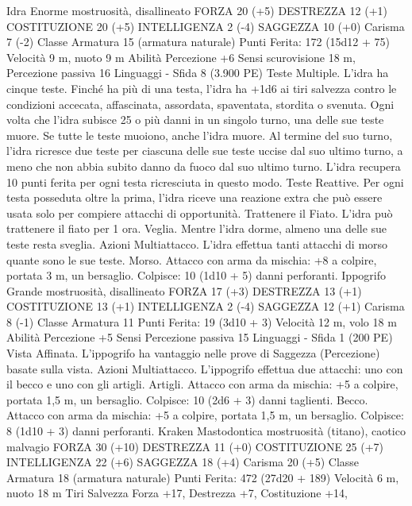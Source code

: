 \begin{multicols}{2}
Idra
Enorme mostruosità, disallineato
FORZA 20 (+5)
DESTREZZA 12 (+1)
COSTITUZIONE 20 (+5)
INTELLIGENZA 2 (-4)
SAGGEZZA 10 (+0)
Carisma 7 (-2)
Classe Armatura 15 (armatura naturale)
\hspace*{0pt}\hfill{Punti Ferita}: 172 (15d12 + 75)
Velocità 9 m, nuoto 9 m
Abilità Percezione +6
Sensi scurovisione 18 m, Percezione passiva 16
Linguaggi -
Sfida 8 (3.900 PE)
Teste Multiple. L’idra ha cinque teste. Finché ha più di una testa,
l’idra ha +1d6 ai tiri salvezza contro le condizioni accecata,
affascinata, assordata, spaventata, stordita o svenuta.
Ogni volta che l’idra subisce 25 o più danni in un singolo turno,
una delle sue teste muore. Se tutte le teste muoiono, anche l’idra
muore.
Al termine del suo turno, l’idra ricresce due teste per ciascuna
delle sue teste uccise dal suo ultimo turno, a meno che non abbia
subito danno da fuoco dal suo ultimo turno. L’idra recupera 10
punti ferita per ogni testa ricresciuta in questo modo.
Teste Reattive. Per ogni testa posseduta oltre la prima, l’idra
riceve una reazione extra che può essere usata solo per compiere
attacchi di opportunità.
Trattenere il Fiato. L’idra può trattenere il fiato per 1 ora.
Veglia. Mentre l’idra dorme, almeno una delle sue teste resta
sveglia.
Azioni
Multiattacco. L’idra effettua tanti attacchi di morso quante sono
le sue teste.
Morso. Attacco con arma da mischia: +8 a colpire, portata 3 m,
un bersaglio.
Colpisce: 10 (1d10 + 5) danni perforanti.
Ippogrifo
Grande mostruosità, disallineato
FORZA 17 (+3)
DESTREZZA 13 (+1)
COSTITUZIONE 13 (+1)
INTELLIGENZA 2 (-4)
SAGGEZZA 12 (+1)
Carisma 8 (-1)
Classe Armatura 11
\hspace*{0pt}\hfill{Punti Ferita}: 19 (3d10 + 3)
Velocità 12 m, volo 18 m
Abilità Percezione +5
Sensi Percezione passiva 15
Linguaggi -
Sfida 1 (200 PE)
Vista Affinata. L’ippogrifo ha vantaggio nelle prove di Saggezza
(Percezione) basate sulla vista.
Azioni
Multiattacco. L’ippogrifo effettua due attacchi: uno con il becco
e uno con gli artigli.
Artigli. Attacco con arma da mischia: +5 a colpire, portata 1,5
m, un bersaglio.
Colpisce: 10 (2d6 + 3) danni taglienti.
Becco. Attacco con arma da mischia: +5 a colpire, portata 1,5 m,
un bersaglio.
Colpisce: 8 (1d10 + 3) danni perforanti.
Kraken
Mastodontica mostruosità (titano), caotico malvagio
FORZA 30 (+10)
DESTREZZA 11 (+0)
COSTITUZIONE 25 (+7)
INTELLIGENZA 22 (+6)
SAGGEZZA 18 (+4)
Carisma 20 (+5)
Classe Armatura 18 (armatura naturale)
\hspace*{0pt}\hfill{Punti Ferita}: 472 (27d20 + 189)
Velocità 6 m, nuoto 18 m
Tiri Salvezza Forza +17, Destrezza +7, Costituzione +14,

\end{multicols}
